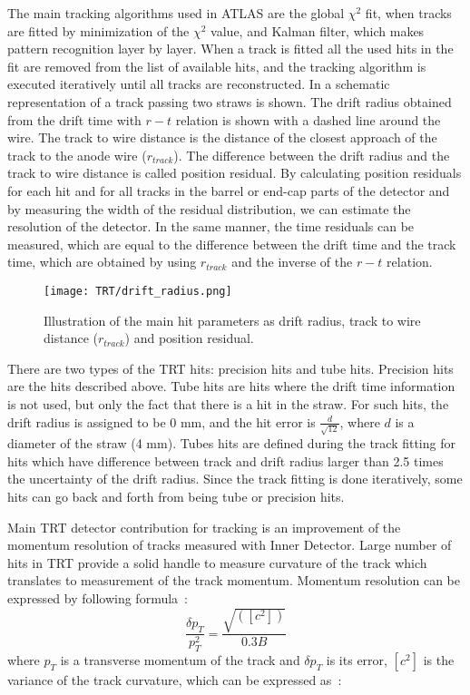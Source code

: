 The main tracking algorithms used in ATLAS are the global $\chi^2$ fit, when tracks are fitted by minimization of the $\chi^2$ value, and Kalman filter, which makes pattern recognition
layer by layer. When a track is fitted all the used hits in the fit are removed from the list of available hits, and the tracking algorithm is executed iteratively until all tracks are reconstructed.
In  a schematic representation of a track passing two straws is shown. The drift radius obtained from the drift time with $r-t$ relation is
shown with a dashed line around the wire. The track to wire distance is the distance of the closest approach of the track to the anode wire ($r_{track}$). The difference
between the drift radius and the track to wire distance is called position residual. By calculating position residuals for each hit and for all
tracks in the barrel or end-cap parts of the detector and by measuring the width of the residual distribution, we can estimate the resolution of the detector.
In the same manner, the time residuals can be measured, which are equal to the difference between the drift time and the track time, which are obtained by using $r_{track}$ and the inverse of the
$r-t$ relation.


\begin{figure}
\centering
\texttt{[image: TRT/drift\_radius.png]}
\caption{ 
 Illustration of the main hit parameters as drift radius, track to wire distance ($r_{track}$) and position residual.
}
\label{fig:drift_radius}
\end{figure}

There are two types of the TRT hits: precision hits and tube hits. Precision hits are the hits described above. Tube hits are hits where the drift time 
information is not used, but only the fact that there is a hit in the straw. For such hits, the drift radius is assigned to be 0 mm, and the hit error is $\frac{d}{\sqrt{12}}$, where
$d$ is a diameter of the straw (4 mm). Tubes hits are defined during the track fitting for hits which have difference between track and drift radius larger than
2.5 times the uncertainty of the drift radius. Since the track fitting is done iteratively, some hits can go back and forth from being tube or precision hits.

Main TRT detector contribution for tracking is an improvement of the momentum resolution of tracks measured with Inner Detector. Large number of hits in TRT provide
a solid handle to measure curvature of the track which translates to measurement of the track momentum. Momentum resolution can be expressed by following formula~\cite{mom_res_book,Gluckstern:1963ng}:
\begin{equation}
\dfrac{\delta p_T}{p_T^2} = \dfrac{\sqrt{([c^2])}}{0.3B}
 \label{eq:momentum_resolution}
\end{equation}
where $p_T$ is a transverse momentum of the track and $\delta p_T$ is its error, $[c^2]$ is the variance of the track curvature, which can be expressed as~\cite{mom_res_book}:

